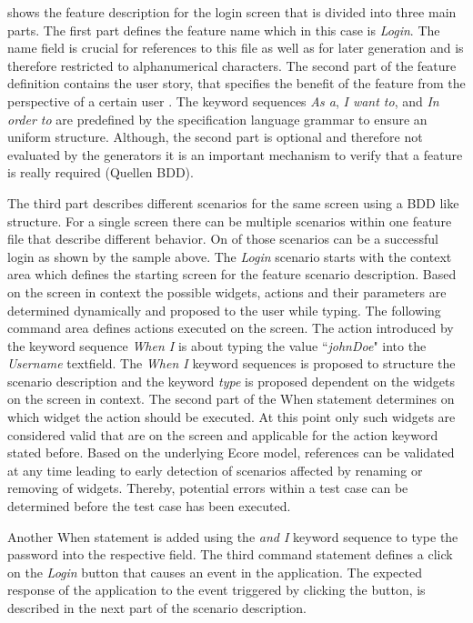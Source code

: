 \documentclass{sig-alternate-05-2015}
\begin{document}
 shows the feature description for the login screen that is divided into three main parts. 
The first part defines the feature name which in this case is \textit{Login}.
The name field is crucial for references to this file as well as for later generation and is therefore restricted to alphanumerical characters.
The second part of the feature definition contains the user story, that specifies the benefit of the feature from the perspective of a certain user \cite{C.Solis.2011}.
The keyword sequences \textit{As a}, \textit{I want to}, and \textit{In order to} are predefined by the specification language grammar to ensure an uniform structure.
Although, the second part is optional and therefore not evaluated by the generators it is an important mechanism to verify that a feature is really required (Quellen BDD).

The third part describes different scenarios for the same screen using a BDD like structure.
For a single screen there can be multiple scenarios within one feature file that describe different behavior.
On of those scenarios can be a successful login as shown by the sample above.
The \textit{Login} scenario starts with the context area which defines the starting screen for the feature scenario description. 
Based on the screen in context the possible widgets, actions and their parameters are determined dynamically and proposed to the user while typing.
The following command area defines actions executed on the screen.
The action introduced by the keyword sequence \textit{When I} is about typing the value ``\textit{johnDoe}" into the \textit{Username} textfield. 
The \textit{When I} keyword sequences is proposed to structure the scenario description and the keyword \textit{type} is proposed dependent on the widgets on the screen in context.
The second part of the When statement determines on which widget the action should be executed.
At this point only such widgets are considered valid that are on the screen and applicable for the action keyword stated before.
Based on the underlying Ecore model, references can be validated at any time leading to early detection of scenarios affected by renaming or removing of widgets.
Thereby, potential errors within a test case can be determined before the test case has been executed.

Another When statement is added using the \textit{and I} keyword sequence to type the password into the respective field.
The third command statement defines a click on the \textit{Login} button that causes an event in the application.
The expected response of the application to the event triggered by clicking the button, is described in the next part of the scenario description.
\end{document}
